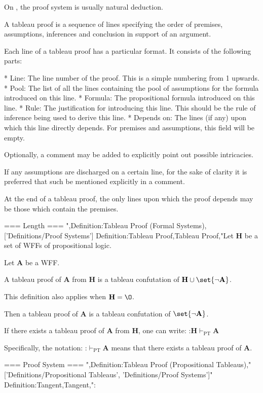 On , the proof system is usually natural deduction.


A tableau proof is a sequence of lines specifying the order of premises, assumptions, inferences and conclusion in support of an argument.


Each line of a tableau proof has a particular format. It consists of the following parts:

* Line: The line number of the proof. This is a simple numbering from 1 upwards.
* Pool: The list of all the lines containing the pool of assumptions for the formula introduced on this line.
* Formula: The propositional formula introduced on this line.
* Rule: The justification for introducing this line. This should be the rule of inference being used to derive this line.
* Depends on: The lines (if any) upon which this line directly depends. For premises and assumptions, this field will be empty.


Optionally, a comment may be added to explicitly point out possible intricacies.

If any assumptions are discharged on a certain line, for the sake of clarity it is preferred that such be mentioned explicitly in a comment.


At the end of a tableau proof, the only lines upon which the proof depends may be those which contain the premises.


=== Length ===
",Definition:Tableau Proof (Formal Systems),['Definitions/Proof Systems']
Definition:Tableau Proof,Tableau Proof,"Let $\mathbf H$ be a set of WFFs of propositional logic.

Let $\mathbf A$ be a WFF.


A tableau proof of $\mathbf A$ from $\mathbf H$ is a tableau confutation of $\mathbf H \cup \set {\neg \mathbf A}$.


This definition also applies when $\mathbf H = \O$.

Then a tableau proof of $\mathbf A$ is a tableau confutation of $\set {\neg \mathbf A}$.


If there exists a tableau proof of $\mathbf A$ from $\mathbf H$, one can write:
:$\mathbf H \vdash_{\mathrm{PT} } \mathbf A$

Specifically, the notation:
:$\vdash_{\mathrm{PT} } \mathbf A$
means that there exists a tableau proof of $\mathbf A$.


=== Proof System ===
",Definition:Tableau Proof (Propositional Tableaus),"['Definitions/Propositional Tableaus', 'Definitions/Proof Systems']"
Definition:Tangent,Tangent,":

